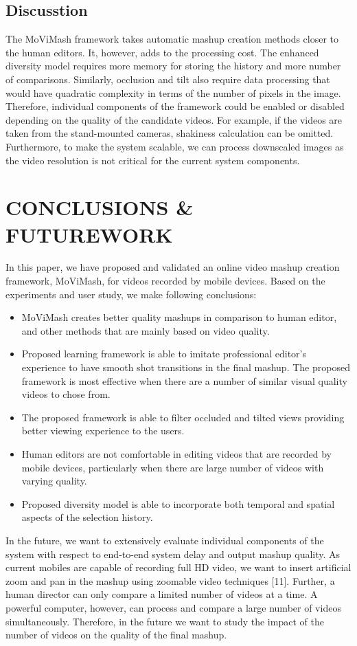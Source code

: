 \documentclass{sig-alternate}
\begin{document}
{{{\subsection{Discusstion}
The MoViMash framework takes automatic mashup creation methods
closer to the human editors. It, however, adds to the processing
cost. The enhanced diversity model requires more memory for storing
the history and more number of comparisons. Similarly, occlusion
and tilt also require data processing that would have quadratic
complexity in terms of the number of pixels in the image. Therefore,
individual components of the framework could be enabled or
disabled depending on the quality of the candidate videos. For example,
if the videos are taken from the stand-mounted cameras,
shakiness calculation can be omitted. Furthermore, to make the
system scalable, we can process downscaled images as the video
resolution is not critical for the current system components.

\section{CONCLUSIONS & FUTUREWORK}
In this paper, we have proposed and validated an online video
mashup creation framework, MoViMash, for videos recorded by
mobile devices. Based on the experiments and user study, we make
following conclusions:
\begin{itemize}
    \item MoViMash creates better quality mashups in comparison to
human editor, and other methods that are mainly based on
video quality.
    \item Proposed learning framework is able to imitate professional
editor’s experience to have smooth shot transitions in the final
mashup. The proposed framework is most effective when there are a number of similar visual quality videos to chose
from.
  \item The proposed framework is able to filter occluded and tilted
views providing better viewing experience to the users.
  \item Human editors are not comfortable in editing videos that are
recorded by mobile devices, particularly when there are large
number of videos with varying quality.
  \item  Proposed diversity model is able to incorporate both temporal
and spatial aspects of the selection history.
\end{itemize}

In the future, we want to extensively evaluate individual components
of the system with respect to end-to-end system delay and
output mashup quality. As current mobiles are capable of recording
full HD video, we want to insert artificial zoom and pan in the
mashup using zoomable video techniques [11]. Further, a human
director can only compare a limited number of videos at a time.
A powerful computer, however, can process and compare a large
number of videos simultaneously. Therefore, in the future we want
to study the impact of the number of videos on the quality of the
final mashup.

}}}
\end{document}
